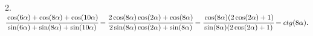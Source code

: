 2. $\cfrac{\cos(6\alpha)+\cos(8\alpha)+\cos(10\alpha)}{\sin(6\alpha)+\sin(8\alpha)+\sin(10\alpha)}=\cfrac{2\cos(8\alpha)\cos(2\alpha)+\cos(8\alpha)}{2\sin(8\alpha)\cos(2\alpha)+
\sin(8\alpha)}=\cfrac{\cos(8\alpha)(2\cos(2\alpha)+1)}{\sin(8\alpha)(2\cos(2\alpha)+1)}=ctg(8\alpha).$\\
